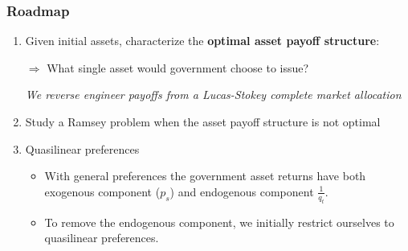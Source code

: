 \documentclass{beamer}
\begin{document}
\begin{frame}
\frametitle{Roadmap}
	\begin{enumerate}
	
		\item  Given initial assets, characterize the \textbf{optimal asset payoff structure}:
		
		$\Rightarrow$ What single asset would  government choose to issue?
		
 		 \emph{We reverse engineer payoffs from a Lucas-Stokey complete market allocation}

			
		
		\item Study a Ramsey problem when the asset payoff structure is not optimal
		\item Quasilinear preferences
	\begin{itemize}		
		\item  With general preferences the government asset returns have both exogenous component ($p_s$) and endogenous component $\frac{1}{q_t}$.
		\item  To remove the endogenous component, we initially restrict ourselves to  quasilinear preferences.
	\end{itemize}
\end{enumerate}
\end{frame}
\end{document}
